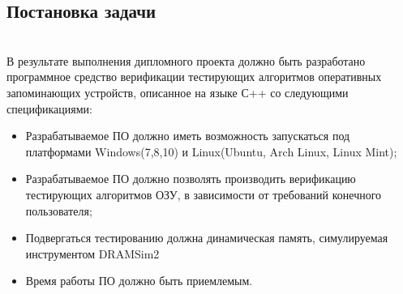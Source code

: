 \subsection{Постановка задачи}~\\
\label{page:domain:task}
В результате выполнения дипломного проекта должно быть разработано программное средство верификации тестирующих алгоритмов оперативных запоминающих устройств, описанное на языке С++ со следующими спецификациями:
\begin{itemize}
  \item Разрабатываемое ПО должно иметь возможность запускаться под платформами Windows(7,8,10) и Linux(Ubuntu, Arch Linux, Linux Mint);
  \item Разрабатываемое ПО должно позволять производить верификацию тестирующих алгоритмов ОЗУ, в зависимости от требований
конечного пользователя;
  \item Подвергаться тестированию должна динамическая память, симулируемая инструментом DRAMSim2
  \item Время работы ПО должно быть приемлемым.
\end{itemize}




